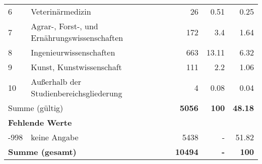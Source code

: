 \begin{longtable}{lXrrr}
     6 &
     \multicolumn{1}{X}{ Veterinärmedizin   } &


       \num{26} &
       \num[round-mode=places,round-precision=2]{0,51} &
         \num[round-mode=places,round-precision=2]{0,25} \\

     7 &
     \multicolumn{1}{X}{ Agrar-, Forst-, und Ernährungswissenschaften   } &


       \num{172} &
       \num[round-mode=places,round-precision=2]{3,4} &
         \num[round-mode=places,round-precision=2]{1,64} \\

     8 &
     \multicolumn{1}{X}{ Ingenieurwissenschaften   } &


       \num{663} &
       \num[round-mode=places,round-precision=2]{13,11} &
         \num[round-mode=places,round-precision=2]{6,32} \\

     9 &
     \multicolumn{1}{X}{ Kunst, Kunstwissenschaft   } &


       \num{111} &
       \num[round-mode=places,round-precision=2]{2,2} &
         \num[round-mode=places,round-precision=2]{1,06} \\

     10 &
     \multicolumn{1}{X}{ Außerhalb der Studienbereichsgliederung   } &


       \num{4} &
       \num[round-mode=places,round-precision=2]{0,08} &
         \num[round-mode=places,round-precision=2]{0,04} \\
     \midrule
     \multicolumn{2}{l}{Summe (gültig)} &
       \textbf{\num{5056}} &
     \textbf{100} &
       \textbf{\num[round-mode=places,round-precision=2]{48,18}} \\
     \multicolumn{5}{l}{\textbf{Fehlende Werte}}\\
       -998 &
       keine Angabe &
         \num{5438} &
        - &
         \num[round-mode=places,round-precision=2]{51,82} \\
     \midrule
     \multicolumn{2}{l}{\textbf{Summe (gesamt)}} &
          \textbf{\num{10494}} &
        \textbf{-} &
        \textbf{100} \\
     \bottomrule
     \end{longtable}
     
